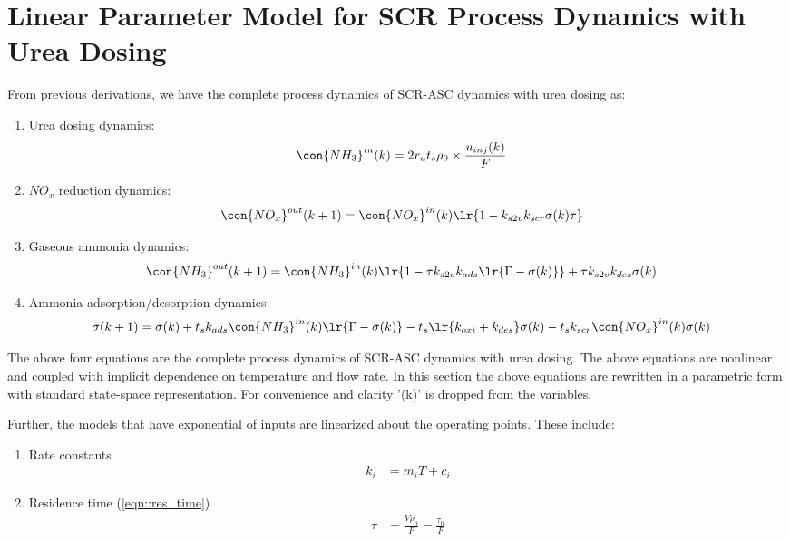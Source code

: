 \newpage
\section{Linear Parameter Model for SCR Process Dynamics with Urea Dosing \label{sec::proc_dyn}}
From previous derivations, we have the complete process dynamics of SCR-ASC dynamics with urea dosing as:

\begin{enumerate}
    \item Urea dosing dynamics:
    \begin{align*}
    \con{NH_3}^{in} (k) &= 2r_u t_s \rho_0 \times \frac{u_{inj}(k)}{F}
    \end{align*}

    \item $NO_x$ reduction dynamics:
    \begin{align*}
    \con{NO_x}^{out} (k + 1) &= \con{NO_x}^{in} (k) \lr{1 - k_{s2v} k_{scr} \sigma(k) \tau}
    \end{align*}

    \item Gaseous ammonia dynamics:
    \begin{align*}
    \con{NH_3}^{out} (k + 1) &= \con{NH_3}^{in}(k) \lr{1 - \tau k_{s2v}k_{ads} \lr{\Gamma - \sigma(k)}} + \tau k_{s2v} k_{des} \sigma(k)
    \end{align*}

    \item Ammonia adsorption/desorption dynamics:
 \begin{align*}
        \sigma(k + 1) &= \sigma(k)
        + t_s  k_{ads} \con{NH_3}^{in}(k) \lr{\Gamma - \sigma(k)}
        - t_s \lr{k_{oxi} + k_{des}} \sigma(k)
        - t_s k_{scr} \con{NO_x}^{in}(k) \sigma(k)
    \end{align*}
\end{enumerate}

The above four equations are the complete process dynamics of SCR-ASC dynamics with urea dosing. The above equations are
nonlinear and coupled with implicit dependence on temperature and flow rate. In this section the above equations are
rewritten in a parametric form with standard state-space representation. For convenience and clarity '(k)' is dropped
from the variables.


Further, the models that have exponential of inputs are linearized about the operating points. These include:
\begin{enumerate}
    \item Rate constants
        \begin{align}
            k_i &= m_i T + c_i
        \end{align}
    \item Residence time (\ref{eqn::res_time})
        \begin{align}
            \tau &= \frac{V \rho_0}{F} = \frac{\tau_0}{F}
        \end{align}
\end{enumerate}

